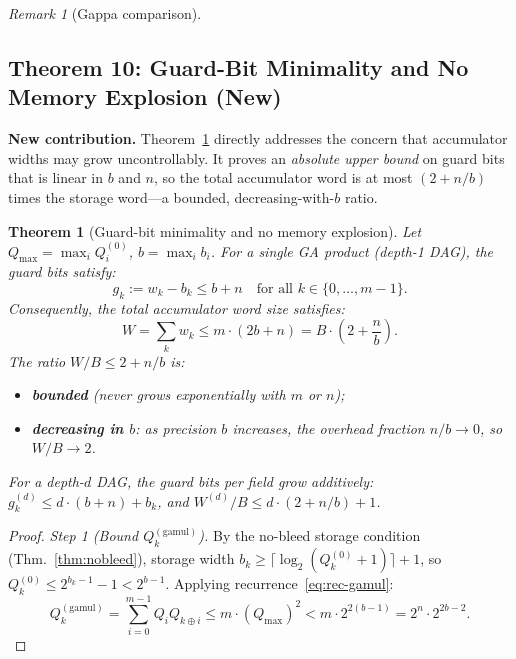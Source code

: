 \documentclass[11pt,a4paper]{article}
\theoremstyle{definition}
\theoremstyle{plain}
\newtheorem{theorem}{Theorem}[section]
\theoremstyle{remark}
\newtheorem{remark}{Remark}[section]
\newcommand{\ceil}[1]{\lceil #1 \rceil}
\newcommand{\guardbit}{g}
\begin{document}
\begin{remark}[Gappa comparison]
\subsection{Theorem 10: Guard-Bit Minimality and No Memory Explosion (New)}
\label{sec:guardbit}

\begin{newresult}
\textbf{New contribution.} Theorem~\ref{thm:guardbit} directly addresses
the concern that accumulator widths may grow uncontrollably.
It proves an \emph{absolute upper bound} on guard bits that is linear
in $b$ and $n$, so the total accumulator word is at most $(2+n/b)$
times the storage word---a bounded, decreasing-with-$b$ ratio.
\end{newresult}

\begin{theorem}[Guard-bit minimality and no memory explosion]\label{thm:guardbit}
Let $Q_{\max} = \max_i Q_i^{(0)}$, $b = \max_i b_i$.
For a single GA product (depth-1 DAG), the guard bits satisfy:
\begin{equation}\label{eq:guardbit-bound}
  \guardbit_k := w_k - b_k \le b + n \quad \text{for all } k \in \{0,\ldots,m-1\}.
\end{equation}
Consequently, the total accumulator word size satisfies:
\begin{equation}\label{eq:no-explosion}
  W = \sum_k w_k \le m \cdot (2b + n) = B\cdot\left(2 + \frac{n}{b}\right).
\end{equation}
The ratio $W/B \le 2 + n/b$ is:
\begin{itemize}
  \item \textbf{bounded} (never grows exponentially with $m$ or $n$);
  \item \textbf{decreasing in $b$}: as precision $b$ increases, the
        overhead fraction $n/b\to 0$, so $W/B\to 2$.
\end{itemize}
For a depth-$d$ DAG, the guard bits per field grow additively:
$\guardbit_k^{(d)} \le d\cdot(b + n) + b_k$, and $W^{(d)}/B \le d\cdot(2+n/b)+1$.
\end{theorem}

\begin{proof}
\textit{Step 1 (Bound $Q_k^{(\mathrm{gamul})}$).}
By the no-bleed storage condition (Thm.~\ref{thm:nobleed}), storage
width $b_k\ge\ceil{\log_2(Q_k^{(0)}+1)}+1$, so $Q_k^{(0)}\le 2^{b_k-1}-1< 2^{b-1}$.
Applying recurrence~\eqref{eq:rec-gamul}:
\begin{equation}\label{eq:Qgamul-bound}
  Q_k^{(\mathrm{gamul})} = \sum_{i=0}^{m-1}Q_i Q_{k\oplus i}
  \le m \cdot (Q_{\max})^2 < m\cdot 2^{2(b-1)} = 2^n \cdot 2^{2b-2}.
\end{equation}


\end{proof}
\end{remark}
\end{document}
